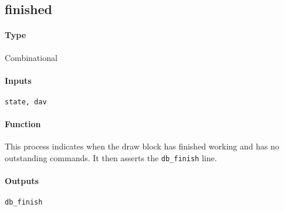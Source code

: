 \documentclass[12pt]{article}
\begin{document}
\subsection{finished}
\paragraph{Type}
Combinational
\paragraph{Inputs}
\verb|state, dav|
\paragraph{Function}
This process indicates when the draw block has finished working and
has no outstanding commands. It then asserts the \verb|db_finish|
line.
\paragraph{Outputs}
\verb|db_finish|
\end{document}
